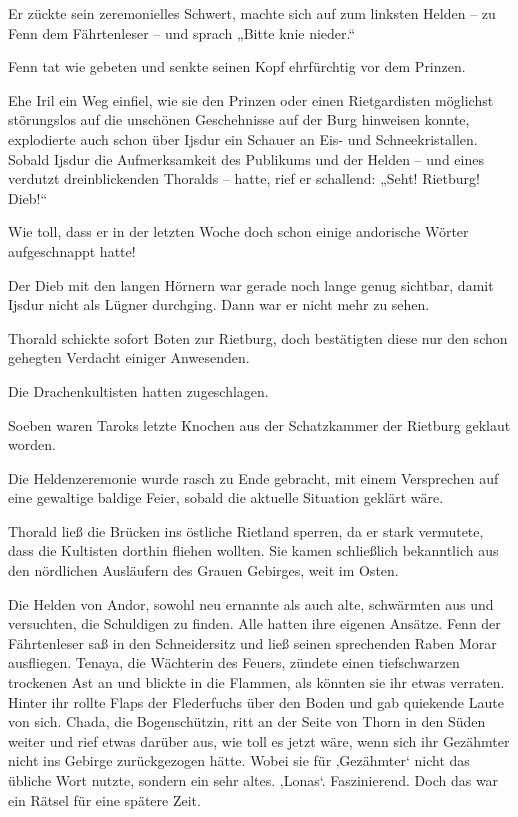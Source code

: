 Er zückte sein zeremonielles Schwert, machte sich auf zum linksten Helden – zu Fenn dem Fährtenleser – und sprach „Bitte knie nieder.“

Fenn tat wie gebeten und senkte seinen Kopf ehrfürchtig vor dem Prinzen.

Ehe Iril ein Weg einfiel, wie sie den Prinzen oder einen Rietgardisten möglichst störungslos auf die unschönen Geschehnisse auf der Burg hinweisen konnte, explodierte auch schon über Ijsdur ein Schauer an Eis- und Schneekristallen. Sobald Ijsdur die Aufmerksamkeit des Publikums und der Helden – und eines verdutzt dreinblickenden Thoralds – hatte, rief er schallend: „Seht! Rietburg! Dieb!“

Wie toll, dass er in der letzten Woche doch schon einige andorische Wörter aufgeschnappt hatte!

Der Dieb mit den langen Hörnern war gerade noch lange genug sichtbar, damit Ijsdur nicht als Lügner durchging. Dann war er nicht mehr zu sehen.

Thorald schickte sofort Boten zur Rietburg, doch bestätigten diese nur den schon gehegten Verdacht einiger Anwesenden.

Die Drachenkultisten hatten zugeschlagen.

Soeben waren Taroks letzte Knochen aus der Schatzkammer der Rietburg geklaut worden.



\trennzeichen



Die Heldenzeremonie wurde rasch zu Ende gebracht, mit einem Versprechen auf eine gewaltige baldige Feier, sobald die aktuelle Situation geklärt wäre.

Thorald ließ die Brücken ins östliche Rietland sperren, da er stark vermutete, dass die Kultisten dorthin fliehen wollten. Sie kamen schließlich bekanntlich aus den nördlichen Ausläufern des Grauen Gebirges, weit im Osten.

Die Helden von Andor, sowohl neu ernannte als auch alte, schwärmten aus und versuchten, die Schuldigen zu finden. Alle hatten ihre eigenen Ansätze. Fenn der Fährtenleser saß in den Schneidersitz und ließ seinen sprechenden Raben Morar ausfliegen. Tenaya, die Wächterin des Feuers, zündete einen tiefschwarzen trockenen Ast an und blickte in die Flammen, als könnten sie ihr etwas verraten. Hinter ihr rollte Flaps der Flederfuchs über den Boden und gab quiekende Laute von sich. Chada, die Bogenschützin, ritt an der Seite von Thorn in den Süden weiter und rief etwas darüber aus, wie toll es jetzt wäre, wenn sich ihr Gezähmter nicht ins Gebirge zurückgezogen hätte. Wobei sie für ‚Gezähmter‘ nicht das übliche Wort nutzte, sondern ein sehr altes. ‚Lonas‘. Faszinierend. Doch das war ein Rätsel für eine spätere Zeit.

